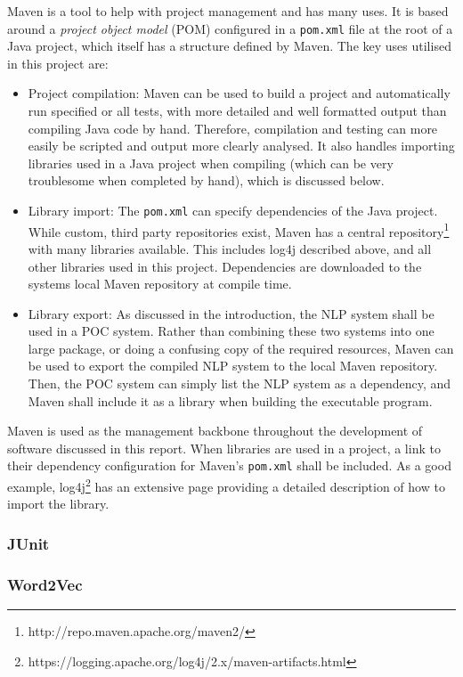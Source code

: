 Maven is a tool to help with project management and has many uses. It is based around a \textit{project object model} (POM) configured in a \texttt{pom.xml} file at the root of a Java project, which itself has a structure defined by Maven. The key uses utilised in this project are:
\begin{itemize}
	\item Project compilation: Maven can be used to build a project and automatically run specified or all tests, with more detailed and well formatted output than compiling Java code by hand. Therefore, compilation and testing can more easily be scripted and output more clearly analysed. It also handles importing libraries used in a Java project when compiling (which can be very troublesome when completed by hand), which is discussed below.
	\item Library import: The \texttt{pom.xml} can specify dependencies of the Java project. While custom, third party repositories exist, Maven has a central repository\footnote{http://repo.maven.apache.org/maven2/} with many libraries available. This includes log4j described above, and all other libraries used in this project. Dependencies are downloaded to the systems local Maven repository at compile time.
	\item Library export: As discussed in the introduction, the NLP system shall be used in a POC system. Rather than combining these two systems into one large package, or doing a confusing copy of the required resources, Maven can be used to export the compiled NLP system to the local Maven repository. Then, the POC system can simply list the NLP system as a dependency, and Maven shall include it as a library when building the executable program.
\end{itemize}

Maven is used as the management backbone throughout the development of software discussed in this report. When libraries are used in a project, a link to their dependency configuration for Maven's \texttt{pom.xml} shall be included. As a good example, log4j\footnote{https://logging.apache.org/log4j/2.x/maven-artifacts.html} has an extensive page providing a detailed description of how to import the library.

\subsubsection*{JUnit}

\subsubsection*{Word2Vec}
